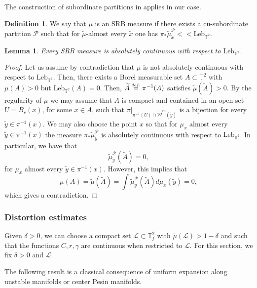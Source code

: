 \documentclass[a4paper,11pt,reqno]{amsart}
\newcommand{\TT}{{\mathbb{T}^2}}
\newcommand{\TTf}{{\mathbb{T}_f^2}}
\newcommand{\cL}{{\mathcal L}}
\newcommand{\cP}{{\mathcal P}}
\newcommand{\cW}{{\mathcal W}}
\newcommand{\eqdef}{\stackrel{\scriptscriptstyle\textrm def.}{=}}
\newcommand{\Leb}{\textrm{Leb}}
\newcommand{\tix}{\tilde{x}}
\newcommand{\tm}{\tilde{\mu}}
\newcommand{\w}{\widetilde{\cW}}
\newtheorem{lemma}[theorem]{Lemma}
\theoremstyle{definition}
\newtheorem{definition}[theorem]{Definition}
\begin{document}
The construction of subordinate partitions in \cite{LedStr} applies in our case. 

\begin{definition}
\label{def:srb}
    We say that $\mu$ is an SRB measure if there exists a cu-subordinate partition $\cP$ such that for $\tm$-almost every $\tix$ one has $\pi_{*}\tm^{\cP}_{\tix}<<\Leb_{\TT}$.
\end{definition}

\begin{lemma}
    \label{lem:srbendo}
Every SRB measure is absolutely continuous with respect to $\Leb_{\TT}$.
\end{lemma}
\begin{proof}
Let us assume by contradiction that $\mu$ is not absolutely continuous with respect to $\Leb_{\TT}$. Then, there exists a Borel measurable set $A\subset\TT$ with $\mu(A)>0$ but $\Leb_{\TT}(A)=0$. Then, $\widetilde{A}\eqdef\pi^{-1}(A)$ satisfies $\tm(\widetilde{A})>0$. By the regularity of $\mu$ we may assume that $A$ is compact and contained in an open set $U=B_r(x)$, for some $x\in A$, such that $\pi|_{\pi^{-1}(U)\cap\w^{cu}(\tilde{y})}$ is a bijection for every $\tilde{y}\in\pi^{-1}(x)$. We may also choose the point $x$ so that for $\mu_x$ almost every $\tilde{y}\in\pi^{-1}(x)$ the measure $\pi_*\tm^{\cP}_{\tilde{y}}$ is absolutely continuous with respect to $\Leb_{\TT}$. In particular, we have that
\[
\tm^{\cP}_{\tilde{y}}(\widetilde{A})=0,
\]
for $\mu_x$ almost every $\tilde{y}\in\pi^{-1}(x)$. However, this implies that 
\[
\mu(A)=\tm(\widetilde{A})=\int\tm^{\cP}_{\tilde{y}}(\widetilde{A})d\mu_x(\tilde{y})=0,
\]
which gives a contradiction.
\end{proof}

\subsubsection{Distortion estimates}

Given $\delta>0$, we can choose a compact set $\cL\subset\TTf$ with $\tilde{\mu}(\cL)>1-\delta$ and such that the functions $C,r,\gamma$ are continuous when restricted to $\cL$. For this section, we fix $\delta>0$ and $\cL$. 

The following result is a classical consequence of uniform expansion along unstable manifolds or center Pesin manifolds.
\end{document}
